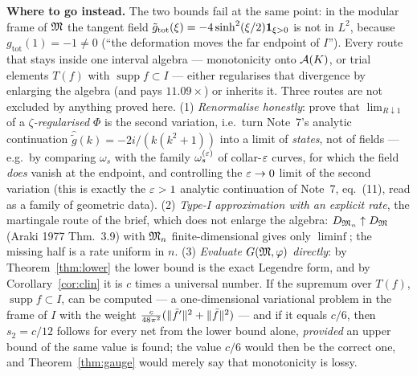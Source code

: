 \documentclass[11pt]{article}
\newcommand{\gtot}{g_{\mathrm{tot}}}\newcommand{\ktil}{\tilde k}
\newcommand{\supp}{\operatorname{supp}}\newcommand{\Ad}{\operatorname{Ad}}
\begin{document}
\textbf{Where to go instead.}  The two bounds fail at the same point: in the modular frame of $\mathfrak M$ the
tangent field $\tilde\gtot(\xi)=-4\sinh^2(\xi/2)\one_{\xi>0}$ is not in $L^2$, because $\gtot(1)=-1\ne0$
(``the deformation moves the far endpoint of $I$'').  Every route that stays inside one interval algebra
--- monotonicity onto $\mathcal A(K)$, or trial elements $T(f)$ with $\supp f\subset I$ --- either regularises
that divergence by enlarging the algebra (and pays $11.09\times$) or inherits it.  Three routes are not
excluded by anything proved here.
(1) \emph{Renormalise honestly}: prove that $\lim_{R\downarrow1}$ of a \emph{$\zeta$-regularised}
$\Phi$ is the second variation, i.e.\ turn Note~7's analytic continuation
$\hat{\tilde g}(k)=-2i/(k(k^2+1))$ into a limit of \emph{states}, not of fields --- e.g.\ by comparing
$\omega_s$ with the family $\omega_s^{(\varepsilon)}$ of collar-$\varepsilon$ curves, for which the field \emph{does}
vanish at the endpoint, and controlling the $\varepsilon\to0$ limit of the second variation (this is exactly the
$\varepsilon>1$ analytic continuation of Note~7, eq.~(11), read as a family of geometric data).
(2) \emph{Type-I approximation with an explicit rate}, the martingale route of the brief, which does not
enlarge the algebra: $D_{\mathfrak M_n}\uparrow D_{\mathfrak M}$ (Araki 1977 Thm.~3.9) with $\mathfrak M_n$ finite-dimensional
gives only $\liminf$; the missing half is a rate uniform in $n$.
(3) \emph{Evaluate $G(\mathfrak M,\varphi)$ directly}: by Theorem~\ref{thm:lower} the lower bound is the exact
Legendre form, and by Corollary~\ref{cor:clin} it is $c$ times a universal number.  If the supremum over
$T(f)$, $\supp f\subset I$, can be computed --- a one-dimensional variational problem in the frame of
$I$ with the weight $\frac c{48\pi^2}(\lVert\tilde f'\rVert^2+\lVert\tilde f\rVert^2)$ --- and if it equals $c/6$,
then $s_2=c/12$ follows for every net from the lower bound alone, \emph{provided} an upper bound of the
same value is found; the value $c/6$ would then be the correct one, and Theorem~\ref{thm:gauge} would
merely say that monotonicity is lossy.
\end{document}
